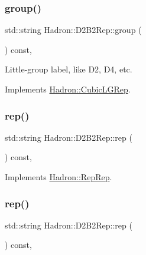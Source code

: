 \subsubsection{\texorpdfstring{group()}{group()}\hspace{0.1cm}{\footnotesize\ttfamily [3/3]}}
{\footnotesize\ttfamily std\+::string Hadron\+::\+D2\+B2\+Rep\+::group (\begin{DoxyParamCaption}{ }\end{DoxyParamCaption}) const\hspace{0.3cm}{\ttfamily [inline]}, {\ttfamily [virtual]}}

Little-\/group label, like D2, D4, etc. 

Implements \mbox{\hyperlink{structHadron_1_1CubicLGRep_a9bdb14b519a611d21379ed96a3a9eb41}{Hadron\+::\+Cubic\+L\+G\+Rep}}.

\mbox{\label{structHadron_1_1D2B2Rep_abef26c913db470d0e9a5c6209c79269f}} 
\subsubsection{\texorpdfstring{rep()}{rep()}\hspace{0.1cm}{\footnotesize\ttfamily [1/3]}}
{\footnotesize\ttfamily std\+::string Hadron\+::\+D2\+B2\+Rep\+::rep (\begin{DoxyParamCaption}{ }\end{DoxyParamCaption}) const\hspace{0.3cm}{\ttfamily [inline]}, {\ttfamily [virtual]}}



Implements \mbox{\hyperlink{structHadron_1_1RepRep_ab3213025f6de249f7095892109575fde}{Hadron\+::\+Rep\+Rep}}.

\mbox{\label{structHadron_1_1D2B2Rep_abef26c913db470d0e9a5c6209c79269f}} 
\subsubsection{\texorpdfstring{rep()}{rep()}\hspace{0.1cm}{\footnotesize\ttfamily [2/3]}}
{\footnotesize\ttfamily std\+::string Hadron\+::\+D2\+B2\+Rep\+::rep (\begin{DoxyParamCaption}{ }\end{DoxyParamCaption}) const\hspace{0.3cm}{\ttfamily [inline]}, {\ttfamily [virtual]}}



